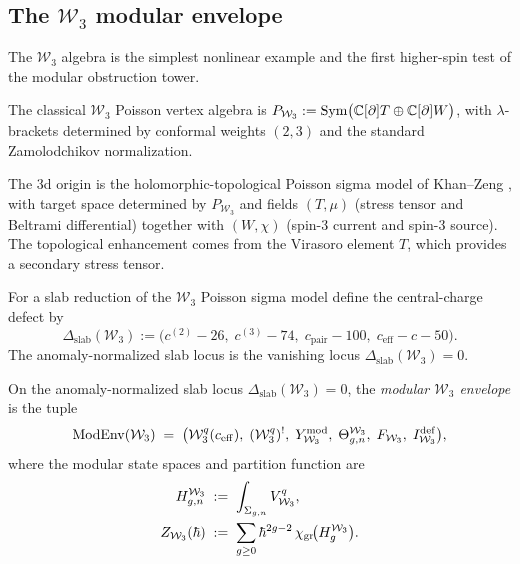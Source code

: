 \subsection{The \texorpdfstring{$\mathcal{W}_3$}{W3} modular envelope}
\label{subsec:w3-modular-envelope}

The $\mathcal{W}_3$ algebra is the simplest nonlinear example and the first
higher-spin test of the modular obstruction tower.

\begin{definition}
\label{def:classical-w3-pva}
The classical $\mathcal{W}_3$ Poisson vertex algebra is
$P_{\mathcal{W}_3} := \operatorname{Sym}\bigl(\mathbb C[\partial]T \oplus \mathbb C[\partial]W\bigr)$,
with $\lambda$-brackets determined by conformal weights $(2,3)$ and the standard
Zamolodchikov normalization.
\end{definition}

The 3d origin is the holomorphic-topological Poisson sigma model of Khan--Zeng
\cite{KZ25}, with target space determined by $P_{\mathcal{W}_3}$ and fields
$(T,\mu)$ (stress tensor and Beltrami differential) together with $(W,\chi)$
(spin-3 current and spin-3 source). The topological enhancement comes from the
Virasoro element $T$, which provides a secondary stress tensor.

\begin{definition}
\label{def:w3-slab-central-charge-defect}
For a slab reduction of the $\mathcal{W}_3$ Poisson sigma model define the
central-charge defect by
\[
\Delta_{\mathrm{slab}}(\mathcal W_3)
:=
\bigl(c^{(2)}-26,\;c^{(3)}-74,\;c_{\mathrm{pair}}-100,\;c_{\mathrm{eff}}-c-50\bigr).
\]
The anomaly-normalized slab locus is the vanishing locus
$\Delta_{\mathrm{slab}}(\mathcal W_3)=0$.
\end{definition}

\begin{definition}
\label{def:modular-w3-envelope}
On the anomaly-normalized slab locus $\Delta_{\mathrm{slab}}(\mathcal W_3)=0$, the
\emph{modular $\mathcal{W}_3$ envelope} is the tuple
\begin{equation}
\label{eq:modular-w3-envelope}
\operatorname{ModEnv}(\mathcal{W}_3)
\;=\;
\bigl(\mathcal{W}_3^q(c_{\mathrm{eff}}),\;
(\mathcal{W}_3^q)^!,\;
Y_{\mathcal{W}_3}^{\mathrm{mod}},\;
\Theta_{g,n}^{\mathcal{W}_3},\;
F_{\mathcal{W}_3},\;
I_{\mathcal{W}_3}^{\mathrm{def}}\bigr),
\end{equation}
where the modular state spaces and partition function are
\begin{align}
\label{eq:w3-state-spaces}
H_{g,n}^{\mathcal{W}_3}
&\;:=\;
\int_{\Sigma_{g,n}} V_{\mathcal{W}_3}^q,
\\
\label{eq:w3-partition-function}
Z_{\mathcal{W}_3}(\hbar)
&\;:=\;
\sum_{g \geq 0} \hbar^{2g-2}\,\chi_{\operatorname{gr}}\!\bigl(H_g^{\mathcal{W}_3}\bigr).
\end{align}
\end{definition}

